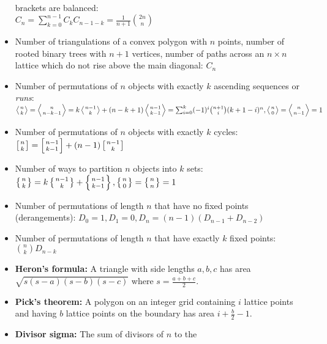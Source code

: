 \documentclass[9pt,a4paper,twocolumn,landscape,oneside]{amsart}
\begin{document}
\begin{itemize}
                brackets are balanced: \\ $C_n = \sum_{k=0}^{n-1} C_kC_{n-1-k}
                = \frac{1}{n+1}\binom{2n}n$
            \item Number of triangulations of a convex polygon with $n$ points,
                number of rooted binary trees with $n+1$ vertices, number of
                paths across an $n\times n$ lattice which do not rise above the
                main diagonal: $C_n$
            \item Number of permutations of $n$ objects with exactly $k$
                ascending sequences or {\it runs}: \\ $\left\langle {n \atop k}
                \right\rangle = \left\langle {n \atop n - k - 1} \right\rangle
                = k\left\langle {n - 1 \atop k} \right\rangle + (n - k +
                1)\left\langle {n-1 \atop k-1} \right\rangle =
                \sum_{i=0}^{k}(-1)^i \binom{n+1}{i} (k+1-i)^n, \left\langle {n
                \atop 0} \right\rangle = \left\langle {n \atop n -1}
                \right\rangle = 1$
            \item Number of permutations of $n$ objects with exactly $k$
                cycles: $\left[n \atop k\right] = \left[n-1 \atop k-1\right] +
                (n-1)\left[n-1 \atop k\right]$
            \item Number of ways to partition $n$ objects into $k$ sets:
                $\left\{n \atop k\right\} = k\left\{n-1 \atop k\right\} +
                \left\{n-1 \atop k-1\right\}, \left\{n\atop 0\right\} =
                \left\{n\atop n\right\} = 1$
            \item Number of permutations of length $n$ that have no fixed
                points (derangements): $D_0 = 1, D_1 = 0, D_n = (n - 1)(D_{n-1}
                + D_{n-2})$
            \item Number of permutations of length $n$ that have exactly $k$
                fixed points: $\binom{n}{k} D_{n-k}$
            \item \textbf{Heron's formula:} A triangle with side lengths
                $a,b,c$ has area $\sqrt{s(s-a)(s-b)(s-c)}$ where $s =
                \frac{a+b+c}{2}$.
            \item \textbf{Pick's theorem:} A polygon on an integer grid
                containing $i$ lattice points and having $b$ lattice points on
                the boundary has area $i + \frac{b}{2} - 1$.
            \item \textbf{Divisor sigma:} The sum of divisors of $n$ to the

\end{itemize}
\end{document}
